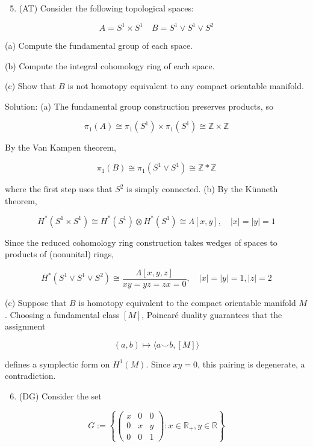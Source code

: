 \documentclass[10pt]{article}
\begin{document}
\begin{enumerate}
  \setcounter{enumi}{4}
  \item (AT) Consider the following topological spaces:
\end{enumerate}

$$
A=S^{1} \times S^{1} \quad B=S^{1} \vee S^{1} \vee S^{2}
$$

(a) Compute the fundamental group of each space.

(b) Compute the integral cohomology ring of each space.

(c) Show that $B$ is not homotopy equivalent to any compact orientable manifold.

Solution: (a) The fundamental group construction preserves products, so

$$
\pi_{1}(A) \cong \pi_{1}\left(S^{1}\right) \times \pi_{1}\left(S^{1}\right) \cong \mathbb{Z} \times \mathbb{Z}
$$

By the Van Kampen theorem,

$$
\pi_{1}(B) \cong \pi_{1}\left(S^{1} \vee S^{1}\right) \cong \mathbb{Z} * \mathbb{Z}
$$

where the first step uses that $S^{2}$ is simply connected. (b) By the Künneth theorem,

$$
H^{*}\left(S^{1} \times S^{1}\right) \cong H^{*}\left(S^{1}\right) \otimes H^{*}\left(S^{1}\right) \cong \Lambda[x, y], \quad|x|=|y|=1
$$

Since the reduced cohomology ring construction takes wedges of spaces to products of (nonunital) rings,

$$
H^{*}\left(S^{1} \vee S^{1} \vee S^{2}\right) \cong \frac{\Lambda[x, y, z]}{x y=y z=z x=0}, \quad|x|=|y|=1,|z|=2
$$

(c) Suppose that $B$ is homotopy equivalent to the compact orientable manifold $M$. Choosing a fundamental class $[M]$, Poincaré duality guarantees that the assignment

$$
(a, b) \mapsto\langle a \smile b,[M]\rangle
$$

defines a symplectic form on $H^{1}(M)$. Since $x y=0$, this pairing is degenerate, a contradiction.

\begin{enumerate}
  \setcounter{enumi}{5}
  \item (DG) Consider the set
\end{enumerate}

$$
G:=\left\{\left(\begin{array}{ccc}
x & 0 & 0 \\
0 & x & y \\
0 & 0 & 1
\end{array}\right): x \in \mathbb{R}_{+}, y \in \mathbb{R}\right\}
$$
\end{document}
